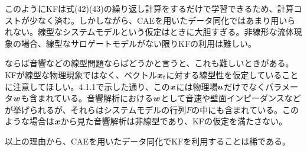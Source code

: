 \documentclass[dvipdfmx, 9pt, a4paper]{jsarticle}
\newcommand{\bm}[1]{{\mbox{\boldmath $#1$}}}
\begin{document}
このようにKFは式(42)(43)の繰り返し計算をするだけで学習できるため、計算コストが少なく済む。しかしながら、CAEを用いたデータ同化ではあまり用いられない。線型なシステムモデルという仮定はときに大胆すぎる。非線形な流体現象の場合、線型なサロゲートモデルがない限りKFの利用は難しい。\par
ならば音響などの線型問題ならばどうかと言うと、これも難しいときがある。KFが線型な物理現象ではなく、ベクトル$\bm x_t$に対する線型性を仮定していることに注意してほしい。4.1.1で示した通り、この$\bm x$には物理場$\bm u$だけでなくパラメータ$\bm w$も含まれている。音響解析における$\bm w$として音速や壁面インピーダンスなどが挙げられるが、それらはシステムモデルの行列$F$の中にも含まれている。このような場合は$\bm x$から見た音響解析は非線型であり、KFの仮定を満たさない。\par
以上の理由から、CAEを用いたデータ同化でKFを利用することは稀である。
\end{document}
